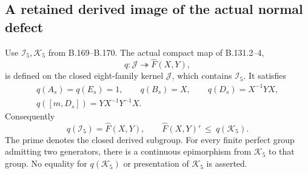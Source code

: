 \subsection*{A retained derived image of the actual normal defect}
\label{stmt:B172}
Use \(\mathcal I_5,\mathcal K_5\) from B.169--B.170.
The actual compact map of B.131.2--4,
\[
 q:\mathcal J\twoheadrightarrow\widehat F(X,Y),
\]
is defined on the closed eight-family kernel \(\mathcal J\), which
contains \(\mathcal I_5\). It satisfies
\begin{equation}\label{eq:B172-exact-images}
 \begin{gathered}
 q(A_s)=q(E_s)=1,\qquad q(B_s)=X,\qquad
 q(D_s)=X^{-1}YX,\\
 q([m,D_s])=YX^{-1}Y^{-1}X.
 \end{gathered}
\end{equation}
Consequently
\begin{equation}\label{eq:B172-derived-bound}
 q(\mathcal I_5)=\widehat F(X,Y),\qquad
 \widehat F(X,Y)'\ \le\ q(\mathcal K_5).
\end{equation}
The prime denotes the closed derived subgroup.
For every finite perfect group admitting two generators, there is
a continuous epimorphism from \(\mathcal K_5\) to that group.
No equality for \(q(\mathcal K_5)\) or presentation of \(\mathcal K_5\)
is asserted.

